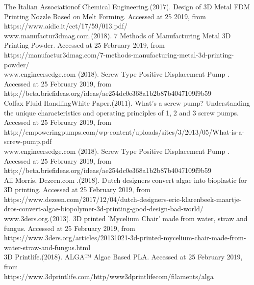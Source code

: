 \documentclass[11pt]{article}
\begin{document}
		The Italian Associationof Chemical Engineering.(2017). Design of 3D Metal FDM Printing Nozzle 	Based on Melt Forming. Accessed at 25 2019, from \\ 
	https://www.aidic.it/cet/17/59/013.pdf/ \\
	
		www.manufactur3dmag.com.(2018). 7 Methods of Manufacturing Metal 3D Printing Powder. Accessed at 25 			February 2019, from \\
	https://manufactur3dmag.com/7-methods-manufacturing-metal-3d-printing-powder/\\
		
	www.engineersedge.com (2018). Screw Type Positive Displacement Pump . Accessed at 25 February 2019, from \\
	http://beta.briefideas.org/ideas/ae254dc0e368a1b2b87b4047109f9b59\\
	
	Colfax Fluid HandlingWhite Paper.(2011). What’s a screw pump? Understanding the unique characteristics and operating principles of 1, 2 and 3 screw pumps. Accessed at  25 February 2019, from \\
	http://empoweringpumps.com/wp-content/uploads/sites/3/2013/05/What-is-a-screw-pump.pdf\\
	
	www.engineersedge.com (2018). Screw Type Positive Displacement Pump . Accessed at 25 February 2019, from \\
	http://beta.briefideas.org/ideas/ae254dc0e368a1b2b87b4047109f9b59\\
	
		Ali Morris, Dezeen.com .(2018). Dutch designers convert algae into bioplastic for 3D printing. Accessed at 25 February 2019, from \\
	https://www.dezeen.com/2017/12/04/dutch-designers-eric-klarenbeek-maartje-dros-convert-algae-biopolymer-3d-printing-good-design-bad-world/	\\
	
		www.3ders.org.(2013). 3D printed 'Mycelium Chair' made from water, straw and fungus. Accessed at 25 February 2019, from \\
	https://www.3ders.org/articles/20131021-3d-printed-mycelium-chair-made-from-water-straw-and-fungus.html\\
	
		3D Printlife.(2018). ALGA™ Algae Based PLA. Accessed at 25 February 2019, from \\
	https://www.3dprintlife.com/http/www3dprintlifecom/filaments/alga\\
	
\end{document}
